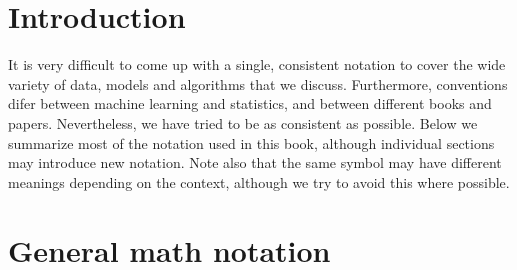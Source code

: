 \label{sec:Notation}

\section*{Introduction}
It is very difficult to come up with a single, consistent notation to cover the wide variety of
data, models and algorithms that we discuss. Furthermore, conventions difer between machine
learning and statistics, and between different books and papers. Nevertheless, we have tried
to be as consistent as possible. Below we summarize most of the notation used in this book,
although individual sections may introduce new notation. Note also that the same symbol may
have different meanings depending on the context, although we try to avoid this where possible.


\section*{General math notation}

